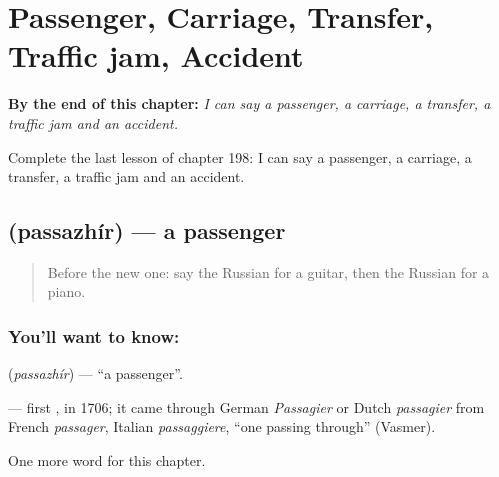 
\chapter{Passenger, Carriage, Transfer, Traffic jam, Accident}
\label{ch:ru-passenger-carriage-transfer-traffic-jam-accident}

\begin{chapteropening}
\textbf{By the end of this chapter:} \emph{I can say a passenger, a carriage, a transfer, a traffic jam and an accident.}

Complete the last lesson of chapter 198: I can say a passenger, a carriage, a transfer, a traffic jam and an accident.
\end{chapteropening}

\section[\texorpdfstring{\ru{пассажир} (passazhír)}{пассажир (passazhír)}]{ (passazhír) — a passenger}

\label{lesson:RU-C198-passazhir}



\begin{quote}
Before the new one: say the Russian for a guitar, then the Russian for a piano.
\end{quote}

\subsection*{You'll want to know: }
\textbf{} (\emph{passazhír}) — \textquotedblleft{}a passenger\textquotedblright{}.

\begin{cousinweb}
\textbf{} — first \emph{}, in 1706; it came through German \emph{Passagier} or Dutch \emph{passagier} from French \emph{passager}, Italian \emph{passaggiere}, \textquotedblleft{}one passing through\textquotedblright{} (Vasmer).
\end{cousinweb}

\begin{grammarlens}[title={What you've built}]
One more word for this chapter.
\end{grammarlens}

